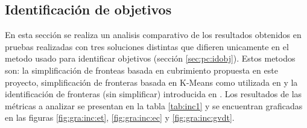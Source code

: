 \subsection{Identificación de objetivos}\label{sec:exp:idobj}
En esta sección se realiza un analisis comparativo de los resultados obtenidos
en pruebas realizadas con tres soluciones distintas que difieren unicamente en
el metodo usado para identificar objetivos (sección \ref{sec:pc:idobj}). Estos
metodos son: la simplificación de fronteas basada en cubrimiento propuesta en
este proyecto, simplificación de fronteras basada en K-Means como utilizada en
\cite{amorin2019novel} y la identificación de fronteras (sin simplificar)
introducida en \cite{yamauchi1998frontier}. Los resultados de las métricas a
analizar se presentan en la tabla \ref{tab:inc1} y se encuentran graficadas en
las figuras \ref{fig:gra:inc:et}, \ref{fig:gra:inc:ec} y
\ref{fig:gra:inc:gvdt}.

